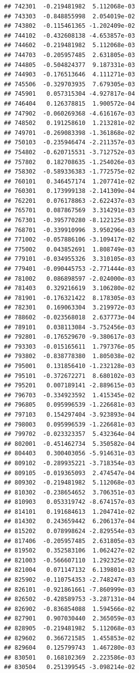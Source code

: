 \documentclass[ignorenonframetext,]{beamer}
\begin{document}
\begin{frame}[fragile]
\begin{verbatim}
## 742301  -0.219481982  5.112068e-03
## 743303  -0.848855998  2.054019e-02
## 743802  -0.115461365 -1.202409e-02
## 744102  -0.432608138 -4.653857e-03
## 744602  -0.219481982  5.112068e-03
## 744703  -0.205957485  2.631805e-03
## 744805  -0.504824377  9.187331e-03
## 744903  -0.176513646  4.111271e-03
## 745506  -0.329703935  7.679305e-03
## 745901   0.057315304 -4.927817e-04
## 746404   0.126378815  1.900572e-04
## 747902  -0.060269368 -4.616167e-03
## 748502   0.191258610  1.213281e-02
## 749701  -0.269083398 -1.361868e-02
## 750103  -0.235946474 -2.211357e-03
## 754802  -0.620715531 -3.712752e-03
## 757802   0.182708635 -1.254026e-03
## 758302  -0.589336383 -1.772575e-02
## 760101   0.346457174  1.207741e-02
## 760301   0.173999138 -2.141309e-04
## 762201   0.076178863 -2.622437e-03
## 765701   0.087867569  3.314291e-03
## 767301  -0.395770280 -8.122125e-03
## 768701  -0.339910996  3.950296e-03
## 771002  -0.057886106 -3.109417e-02
## 775002   0.043852691  1.808749e-03
## 779101  -0.034955326  3.310105e-03
## 779401  -0.090445753 -2.771444e-03
## 781002   0.086898597 -2.024000e-03
## 781403   0.329216619  3.106280e-02
## 781901  -0.176321422  8.178305e-03
## 782301   0.169063304  3.219972e-03
## 788602  -0.023568018  2.637773e-04
## 789101   0.038113084 -3.752456e-03
## 792801  -0.176529670 -9.380617e-03
## 793303  -0.015165611  1.797376e-05
## 793802  -0.838778380  1.805038e-02
## 795001   0.131856410 -1.232128e-03
## 795101  -0.372672271  8.680102e-03
## 795201   0.007189141 -2.889615e-03
## 796703  -0.334923592  1.415345e-02
## 796805   0.095996539 -1.226681e-03
## 797103   0.154297404 -3.923893e-04
## 798003   0.095996539 -1.226681e-03
## 799702  -0.023323357  5.432364e-04
## 802001  -0.451462734  5.350582e-04
## 804403   0.300403056 -5.914631e-03
## 809102  -0.289935221 -3.718354e-03
## 809105  -0.019365093  2.474547e-04
## 809302  -0.219481982  5.112068e-03
## 810302  -0.238654652  3.706351e-03
## 810903   0.053319742 -8.674157e-03
## 814101   0.191684613  1.204741e-02
## 814302   0.243659442  6.206137e-04
## 815202   0.078998624 -2.829554e-03
## 817406  -0.205957485  2.631805e-03
## 819502   0.352583106  1.062427e-02
## 821003  -0.566607110  1.292325e-02
## 821004   0.071147132  6.139801e-03
## 825902  -0.110754353 -2.748247e-03
## 826101  -0.921861661 -7.860999e-03
## 826502  -0.428589753 -3.287131e-04
## 826902  -0.836854088  1.594566e-02
## 827901   0.907030440  2.365059e-03
## 828905  -0.219481982  5.112068e-03
## 829602   0.366721585  1.455853e-02
## 829604   0.125799743  1.467280e-03
## 830501   0.168102369  2.223586e-03
## 830504   0.251399545 -3.098214e-02

\end{verbatim}
\end{frame}
\end{document}
